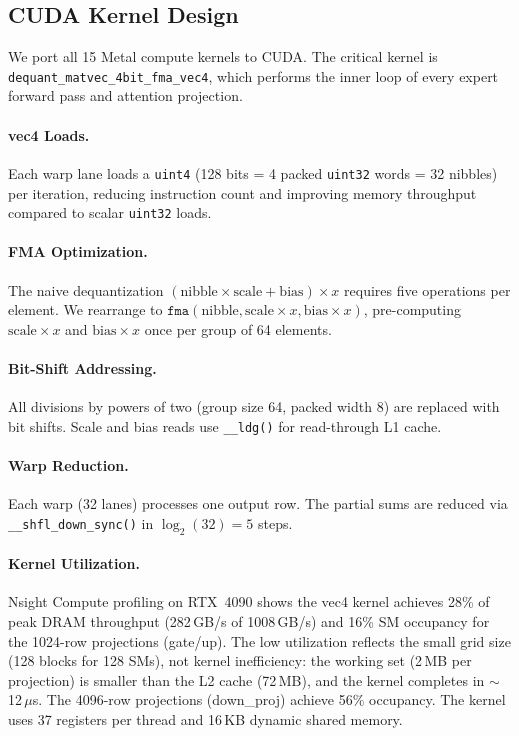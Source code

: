 \documentclass[10pt]{article}
\begin{document}
\subsection{CUDA Kernel Design}

We port all 15 Metal compute kernels to CUDA. The critical kernel is \texttt{dequant\_matvec\_4bit\_fma\_vec4}, which performs the inner loop of every expert forward pass and attention projection.

\paragraph{vec4 Loads.} Each warp lane loads a \texttt{uint4} (128 bits = 4 packed \texttt{uint32} words = 32 nibbles) per iteration, reducing instruction count and improving memory throughput compared to scalar \texttt{uint32} loads.

\paragraph{FMA Optimization.} The naive dequantization $(\text{nibble} \times \text{scale} + \text{bias}) \times x$ requires five operations per element. We rearrange to $\texttt{fma}(\text{nibble}, \text{scale} \times x, \text{bias} \times x)$, pre-computing $\text{scale} \times x$ and $\text{bias} \times x$ once per group of 64 elements.

\paragraph{Bit-Shift Addressing.} All divisions by powers of two (group size 64, packed width 8) are replaced with bit shifts. Scale and bias reads use \texttt{\_\_ldg()} for read-through L1 cache.

\paragraph{Warp Reduction.} Each warp (32 lanes) processes one output row. The partial sums are reduced via \texttt{\_\_shfl\_down\_sync()} in $\log_2(32) = 5$ steps.

\paragraph{Kernel Utilization.} Nsight Compute profiling on RTX~4090 shows the vec4 kernel achieves 28\% of peak DRAM throughput (282\,GB/s of 1008\,GB/s) and 16\% SM occupancy for the 1024-row projections (gate/up). The low utilization reflects the small grid size (128 blocks for 128 SMs), not kernel inefficiency: the working set (2\,MB per projection) is smaller than the L2 cache (72\,MB), and the kernel completes in $\sim$12\,$\mu$s. The 4096-row projections (down\_proj) achieve 56\% occupancy. The kernel uses 37 registers per thread and 16\,KB dynamic shared memory.
\end{document}
